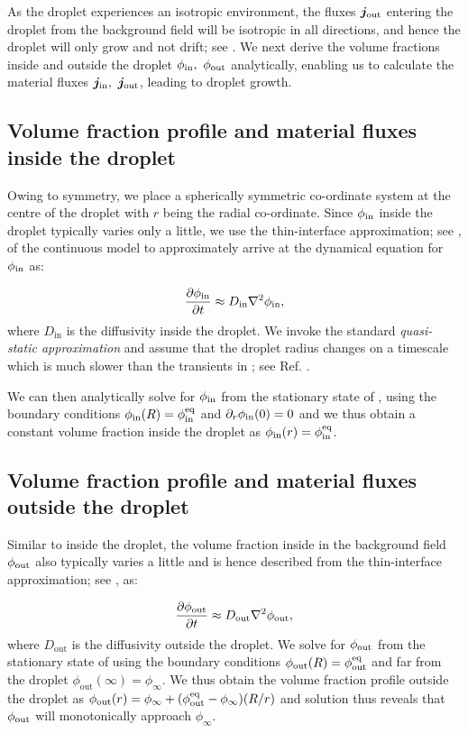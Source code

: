 As the droplet experiences an isotropic environment, the fluxes $\boldsymbol{j}_\mathrm{out}$ entering the droplet from the background field will be isotropic in all directions, and hence the droplet will only grow and not drift; see .
We next derive the volume fractions inside and outside the droplet $\phi_\mathrm{in},~\phi_\mathrm{out}$ analytically, enabling us to calculate the material fluxes $\boldsymbol{j}_\mathrm{in},~\boldsymbol{j}_\mathrm{out}$, leading to droplet growth.

\subsection{Volume fraction profile and material fluxes inside the droplet}
Owing to symmetry, we place a spherically symmetric co-ordinate system at the centre of the droplet with $r$ being the radial co-ordinate.
Since $\phi_\mathrm{in}$ inside the droplet typically varies only a little, we use the thin-interface approximation; see , of the continuous model to approximately arrive at the dynamical equation for $\phi_\mathrm{in}$ as:

\begin{align} 
    \label{eqn:RD_droplet_passive}
    \frac{\partial \phi_\mathrm{in}}{\partial t}
        \approx D_\mathrm{in} \nabla^2 \phi_\mathrm{in},
\end{align}
where $D_\mathrm{in}$ is the diffusivity inside the droplet.
We invoke the standard \textit{quasi-static approximation} and assume that the droplet radius changes on a timescale which is much slower than the transients in ; see Ref. \cite{Review2019}.

We can then analytically solve for $\phi_\mathrm{in}$ from the stationary state of , using the boundary conditions $\phi_\mathrm{in}(R) = \phi^\mathrm{eq}_\mathrm{in}$ and $\partial_r \phi_\mathrm{in} (0) = 0$ and we thus obtain a constant volume fraction inside the droplet as $\phi_\mathrm{in}(r) = \phi^\mathrm{eq}_\mathrm{in}$.

\subsection{Volume fraction profile and material fluxes outside the droplet}

Similar to inside the droplet, the volume fraction inside in the background field $\phi_\mathrm{out}$ also typically varies a little and is hence described from the thin-interface approximation; see , as:

\begin{align} 
    \label{eqn:RD_dilute_passive}
    \frac{\partial \phi_\mathrm{out}}{\partial t}
        \approx D_\mathrm{out} \nabla^2 \phi_\mathrm{out},
\end{align}
where $D_\mathrm{out}$ is the diffusivity outside the droplet.
We solve for $\phi_\mathrm{out}$ from the stationary state of  using the boundary conditions $\phi_\mathrm{out}(R) = \phi^\mathrm{eq}_\mathrm{out}$ and far from the droplet $\phi_\mathrm{out}(\infty) = \phi_\infty$.
We thus obtain the volume fraction profile outside the droplet as $\phi_\mathrm{out}(r) = \phi_\infty + (\phi^\mathrm{eq}_\mathrm{out} - \phi_\infty) (R/r)$ and solution thus reveals that $\phi_\mathrm{out}$ will monotonically approach $\phi_\infty$. 

